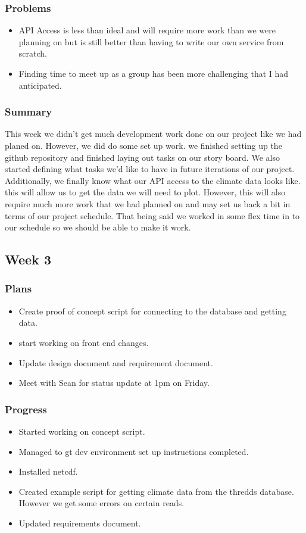 \documentclass[onecolumn, draftclsnofoot,10pt, compsoc]{article}
\begin{document}
			\subsubsection{Problems}
				\begin{itemize}
					\item API Access is less than ideal and will require more work than we were planning on but is still better than having to write our own service from scratch.
					\item Finding time to meet up as a group has been more challenging that I had anticipated.
				\end{itemize}
				
			\subsubsection{Summary}
			This week we didn't get much development work done on our project like we had planed on. However, we did do some set up work. we finished setting up the github repository and finished laying out tasks on our story board. We also started defining what tasks we'd like to have in future iterations of our project. Additionally, we finally know what our API access to the climate data looks like. this will allow us to get the data we will need to plot. However, this will also require much more work that we had planned on and may set us back a bit in terms of our project schedule. That being said we worked in some flex time in to our schedule so we should be able to make it work.\\
			
		\subsection{Week 3}
			\subsubsection{Plans}
				\begin{itemize}
					\item Create proof of concept script for connecting to the database and getting data.
					\item start working on front end changes.
					\item Update design document and requirement document.
					\item Meet with Sean for status update at 1pm on Friday.
				\end{itemize}
			\subsubsection{Progress}
				\begin{itemize}
					\item Started working on concept script.
					\item Managed to gt dev environment set up instructions completed.
					\item Installed netcdf.
					\item Created example script for getting climate data from the thredds database. However we get some errors on certain reads.
					\item Updated requirements document.
				\end{itemize}
\end{document}
